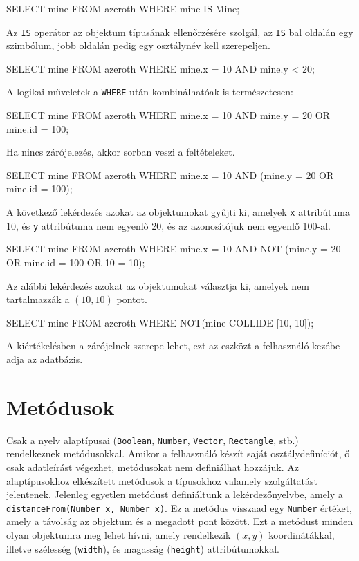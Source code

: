 \begin{sql}
SELECT mine FROM azeroth WHERE mine IS Mine;
\end{sql}

Az \texttt{IS} operátor az objektum típusának ellenőrzésére szolgál, az \texttt{IS} bal oldalán egy szimbólum, jobb oldalán pedig egy osztálynév kell szerepeljen.

\begin{sql}
SELECT mine FROM azeroth WHERE mine.x = 10 AND mine.y < 20;
\end{sql}

A logikai műveletek a \texttt{WHERE} után kombinálhatóak is természetesen:

\begin{sql}
SELECT mine FROM azeroth
WHERE mine.x = 10 AND mine.y = 20 OR mine.id = 100;
\end{sql}

Ha nincs zárójelezés, akkor sorban veszi a feltételeket.

\begin{sql}
SELECT mine FROM azeroth
WHERE mine.x = 10 AND (mine.y = 20 OR mine.id = 100);
\end{sql}

A következő lekérdezés azokat az objektumokat gyűjti ki, amelyek \texttt{x} attribútuma 10, és \texttt{y} attribútuma nem egyenlő 20, és az azonosítójuk nem egyenlő 100-al.

\begin{sql}
SELECT mine FROM azeroth
WHERE mine.x = 10 AND NOT (mine.y = 20 OR mine.id = 100 OR 10 = 10);
\end{sql}

Az alábbi lekérdezés azokat az objektumokat választja ki, amelyek nem tartalmazzák a $(10, 10)$ pontot.
\begin{sql}
SELECT mine FROM azeroth
WHERE NOT(mine COLLIDE [10, 10]);
\end{sql}


A kiértékelésben a zárójelnek szerepe lehet, ezt az eszközt a felhasználó kezébe adja az adatbázis.

\section{Metódusok}

Csak a nyelv alaptípusai (\texttt{Boolean}, \texttt{Number}, \texttt{Vector}, \texttt{Rectangle}, stb.) rendelkeznek metódusokkal. Amikor a felhasználó készít saját osztálydefiníciót, ő csak adatleírást végezhet, metódusokat nem definiálhat hozzájuk. Az alaptípusokhoz elkészített metódusok a típusokhoz valamely szolgáltatást jelentenek. Jelenleg egyetlen metódust definiáltunk a lekérdezőnyelvbe, amely a \texttt{distanceFrom(Number x, Number x)}. Ez a metódus visszaad egy \texttt{Number} értéket, amely a távolság az objektum és a megadott pont között. Ezt a metódust minden olyan objektumra meg lehet hívni, amely rendelkezik $(x, y)$ koordinátákkal, illetve szélesség (\texttt{width}), és magasság (\texttt{height}) attribútumokkal.

